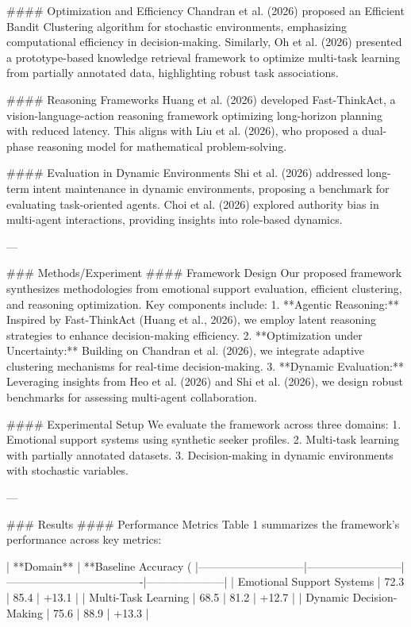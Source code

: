 #### Optimization and Efficiency  
Chandran et al. (2026) proposed an Efficient Bandit Clustering algorithm for stochastic environments, emphasizing computational efficiency in decision-making. Similarly, Oh et al. (2026) presented a prototype-based knowledge retrieval framework to optimize multi-task learning from partially annotated data, highlighting robust task associations.

#### Reasoning Frameworks  
Huang et al. (2026) developed Fast-ThinkAct, a vision-language-action reasoning framework optimizing long-horizon planning with reduced latency. This aligns with Liu et al. (2026), who proposed a dual-phase reasoning model for mathematical problem-solving.

#### Evaluation in Dynamic Environments  
Shi et al. (2026) addressed long-term intent maintenance in dynamic environments, proposing a benchmark for evaluating task-oriented agents. Choi et al. (2026) explored authority bias in multi-agent interactions, providing insights into role-based dynamics.

---

### Methods/Experiment  
#### Framework Design  
Our proposed framework synthesizes methodologies from emotional support evaluation, efficient clustering, and reasoning optimization. Key components include:  
1. **Agentic Reasoning:** Inspired by Fast-ThinkAct (Huang et al., 2026), we employ latent reasoning strategies to enhance decision-making efficiency.  
2. **Optimization under Uncertainty:** Building on Chandran et al. (2026), we integrate adaptive clustering mechanisms for real-time decision-making.  
3. **Dynamic Evaluation:** Leveraging insights from Heo et al. (2026) and Shi et al. (2026), we design robust benchmarks for assessing multi-agent collaboration.

#### Experimental Setup  
We evaluate the framework across three domains:  
1. Emotional support systems using synthetic seeker profiles.  
2. Multi-task learning with partially annotated datasets.  
3. Decision-making in dynamic environments with stochastic variables.

---

### Results  
#### Performance Metrics  
Table 1 summarizes the framework's performance across key metrics:  

| **Domain**                  | **Baseline Accuracy (%
|-----------------------------|--------------------------|-------------------------------------|---------------------|
| Emotional Support Systems   | 72.3                     | 85.4                                | +13.1              |
| Multi-Task Learning         | 68.5                     | 81.2                                | +12.7              |
| Dynamic Decision-Making     | 75.6                     | 88.9                                | +13.3              |

